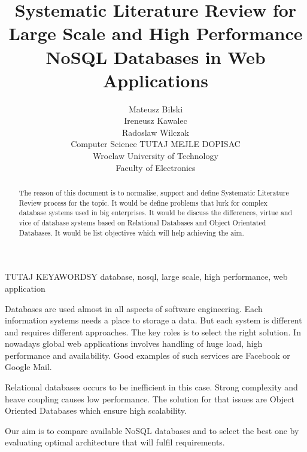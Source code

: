 \documentclass[times, 10pt,twocolumn]{article}
\begin{document}
\title{ Systematic Literature Review
       for Large Scale and High Performance NoSQL Databases in Web Applications}

\author{Mateusz Bilski\\ Ireneusz Kawalec \\ Radoslaw Wilczak\\ Computer Science TUTAJ MEJLE DOPISAC \\
Wroclaw University of Technology\\ Faculty of Electronics \\ 
}

\maketitle
\thispagestyle{empty}

\begin{abstract}  

The reason of this document is to normalise, support and define Systematic Literature Review process for the topic.
It would be define problems that lurk for complex database systems used in big enterprises. 
It would be discuss the differences, virtue and vice of database systems based on Relational Databases and Object Orientated Databases.
It would be list objectives which will help achieving the aim.

\end{abstract} 

TUTAJ KEYAWORDSY database, nosql, large scale, high performance, web application


Databases are used almost in all aspects of software engineering. Each 
information systems needs a place to storage a data. But each system is different
and requires different approaches. The key roles is to select the right solution.
In nowadays global web applications involves handling of huge load, high performance and
availability. Good examples of such services are Facebook or Google Mail.

Relational databases occurs to be inefficient in this case. Strong complexity and
heave coupling causes low performance. The solution for that issues are Object Oriented
Databases which ensure high scalability.

Our aim is to compare available NoSQL databases and to select the best one by evaluating 
optimal architecture that will fulfil requirements. 
\end{document}
